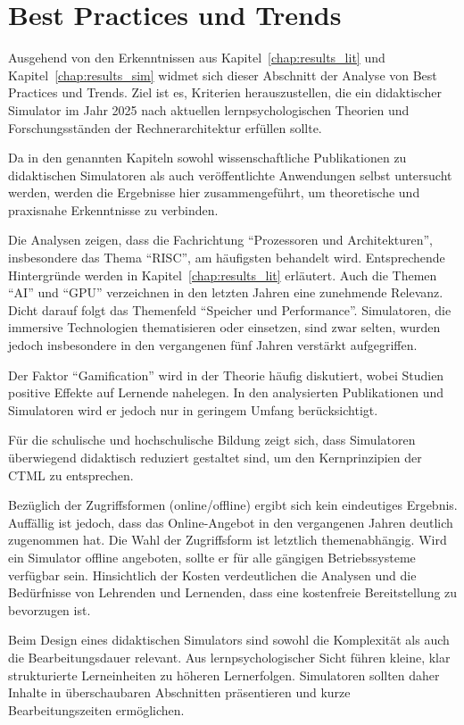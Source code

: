 \section{Best Practices und Trends}

Ausgehend von den Erkenntnissen aus Kapitel~\ref{chap:results_lit} und Kapitel~\ref{chap:results_sim} widmet sich dieser Abschnitt der Analyse von Best Practices und Trends. Ziel ist es, Kriterien herauszustellen, die ein didaktischer Simulator im Jahr 2025 nach aktuellen lernpsychologischen Theorien und Forschungsständen der Rechnerarchitektur erfüllen sollte. 

Da in den genannten Kapiteln sowohl wissenschaftliche Publikationen zu didaktischen Simulatoren als auch veröffentlichte Anwendungen selbst untersucht werden, werden die Ergebnisse hier zusammengeführt, um theoretische und praxisnahe Erkenntnisse zu verbinden.

Die Analysen zeigen, dass die Fachrichtung \enquote{Prozessoren und Architekturen}, insbesondere das Thema \enquote{\acs{RISC}}, am häufigsten behandelt wird. Entsprechende Hintergründe werden in Kapitel~\ref{chap:results_lit} erläutert. Auch die Themen \enquote{AI} und \enquote{GPU} verzeichnen in den letzten Jahren eine zunehmende Relevanz. Dicht darauf folgt das Themenfeld \enquote{Speicher und Performance}. Simulatoren, die immersive Technologien thematisieren oder einsetzen, sind zwar selten, wurden jedoch insbesondere in den vergangenen fünf Jahren verstärkt aufgegriffen.

Der Faktor \enquote{Gamification} wird in der Theorie häufig diskutiert, wobei Studien positive Effekte auf Lernende nahelegen. In den analysierten Publikationen und Simulatoren wird er jedoch nur in geringem Umfang berücksichtigt.

Für die schulische und hochschulische Bildung zeigt sich, dass Simulatoren überwiegend didaktisch reduziert gestaltet sind, um den Kernprinzipien der \ac{CTML} zu entsprechen.

Bezüglich der Zugriffsformen (online/offline) ergibt sich kein eindeutiges Ergebnis. Auffällig ist jedoch, dass das Online-Angebot in den vergangenen Jahren deutlich zugenommen hat. Die Wahl der Zugriffsform ist letztlich themenabhängig. Wird ein Simulator offline angeboten, sollte er für alle gängigen Betriebssysteme verfügbar sein. Hinsichtlich der Kosten verdeutlichen die Analysen und die Bedürfnisse von Lehrenden und Lernenden, dass eine kostenfreie Bereitstellung zu bevorzugen ist.

Beim Design eines didaktischen Simulators sind sowohl die Komplexität als auch die Bearbeitungsdauer relevant. Aus lernpsychologischer Sicht führen kleine, klar strukturierte Lerneinheiten zu höheren Lernerfolgen. Simulatoren sollten daher Inhalte in überschaubaren Abschnitten präsentieren und kurze Bearbeitungszeiten ermöglichen.

